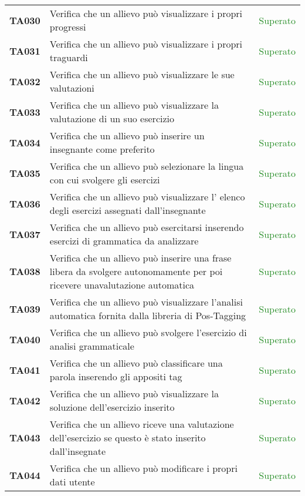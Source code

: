 \begin{tabularx}{\textwidth}{cXc}
	\textbf{TA030} & Verifica che un allievo può visualizzare i propri progressi  & \textcolor{ForestGreen}{Superato} \\
	\textbf{TA031} & Verifica che un allievo può visualizzare i propri traguardi & \textcolor{ForestGreen}{Superato} \\
	\textbf{TA032} & Verifica che un allievo può visualizzare le sue valutazioni  & \textcolor{ForestGreen}{Superato} \\
	\textbf{TA033} & Verifica che un allievo può visualizzare la valutazione di un suo esercizio & \textcolor{ForestGreen}{Superato} \\
    \textbf{TA034} & Verifica che un allievo può inserire un insegnante come preferito  & \textcolor{ForestGreen}{Superato} \\
	\textbf{TA035} & Verifica che un allievo può selezionare la lingua con cui svolgere gli esercizi  & \textcolor{ForestGreen}{Superato} \\
	\textbf{TA036} & Verifica che un allievo può visualizzare l' elenco degli esercizi assegnati dall’insegnante & \textcolor{ForestGreen}{Superato} \\
	\textbf{TA037} & Verifica che un allievo può esercitarsi inserendo esercizi di grammatica da analizzare & \textcolor{ForestGreen}{Superato} \\
	\textbf{TA038} & Verifica che un allievo può inserire una frase libera da svolgere autonomamente per poi ricevere unavalutazione automatica & \textcolor{ForestGreen}{Superato} \\
	\textbf{TA039} & Verifica che un allievo può visualizzare l'analisi automatica fornita dalla libreria di Pos-Tagging  & \textcolor{ForestGreen}{Superato} \\
	\textbf{TA040} & Verifica che un allievo può svolgere l'esercizio di analisi grammaticale & \textcolor{ForestGreen}{Superato} \\
	\textbf{TA041} & Verifica che un allievo può classificare una parola inserendo gli appositi tag & \textcolor{ForestGreen}{Superato} \\
	\textbf{TA042} & Verifica che un allievo può visualizzare la soluzione dell'esercizio inserito & \textcolor{ForestGreen}{Superato} \\
	\textbf{TA043} & Verifica che un allievo riceve una valutazione dell'esercizio se questo è stato inserito dall'insegnate & \textcolor{ForestGreen}{Superato} \\
	\textbf{TA044} & Verifica che un allievo può modificare i propri dati utente & \textcolor{ForestGreen}{Superato} \\

\end{tabularx}
